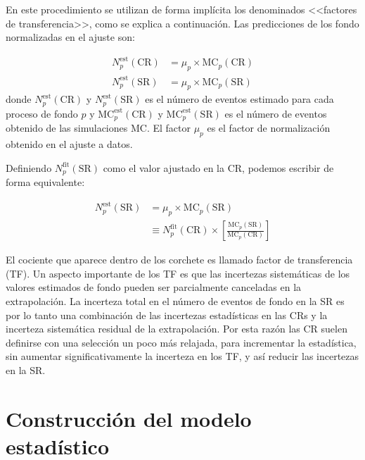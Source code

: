 En este procedimiento se utilizan de forma implícita los
denominados <<factores de transferencia>>, como se explica a continuación.
Las predicciones de los fondo normalizadas en el ajuste son:

\begin{align}
  N_p^{\text{est}}(\text{CR}) &= \mu_p \times \text{MC}_p (\text{CR})
  \\ N_p^{\text{est}}(\text{SR}) &= \mu_p \times \text{MC}_p (\text{SR})
\end{align}
%
donde $N_p^{\text{est}}(\text{CR})$ y $N_p^{\text{est}}(\text{SR})$ es el número
de eventos estimado para cada proceso de fondo $p$ y
$\text{MC}_p^{\text{est}}(\text{CR})$ y $\text{MC}_p^{\text{est}}(\text{SR})$ es
el número de eventos obtenido de las simulaciones MC. El factor $\mu_p$ es el
factor de normalización obtenido en el ajuste a datos.

Definiendo $N_p^\text{fit}(\text{SR})$ como el valor ajustado en la CR, podemos
escribir de forma equivalente:

\begin{align}
  N_p^\text{est}(\text{SR}) &= \mu_p \times \text{MC}_p (\text{SR}) \nonumber \\
  &\equiv N_p^\text{fit}(\text{CR}) \times \left[ \frac{\text{MC}_p(\text{SR})}{\text{MC}_p(\text{CR})} \right]
\end{align}

El cociente que aparece dentro de los corchete es llamado factor de
transferencia (TF). Un aspecto importante de los TF es que las incertezas
sistemáticas de los valores estimados de fondo pueden ser parcialmente
canceladas en la extrapolación. La incerteza total en el número de eventos de
fondo en la SR es por lo tanto una combinación de las incertezas estadísticas en
las CRs y la incerteza sistemática residual de la extrapolación. Por esta razón
las CR suelen definirse con una selección un poco más relajada, para incrementar
la estadística, sin aumentar significativamente la incerteza en los TF, y así
reducir las incertezas en la SR.


\section{Construcción del modelo estadístico}


